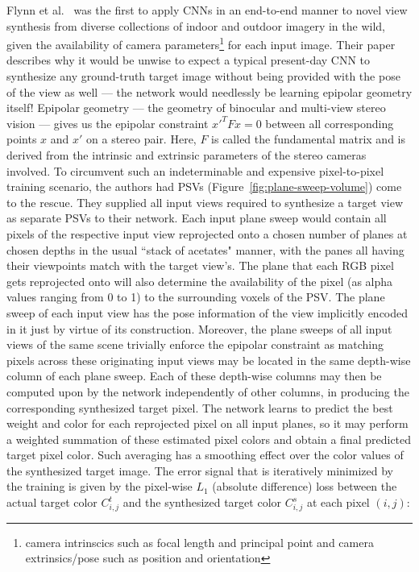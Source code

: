 Flynn et al.~\cite{deep_stereo_2016} was the first to apply CNNs in an end-to-end manner to novel view synthesis from diverse collections of indoor and outdoor imagery in the wild, given the availability of camera parameters\footnote{camera intrinscics such as focal length and principal point and camera extrinsics/pose such as position and orientation} for each input image. Their paper describes why it would be unwise to expect a typical present-day CNN to synthesize any ground-truth target image without being provided with the pose of the view as well --- the network would needlessly be learning epipolar geometry itself! Epipolar geometry --- the geometry of binocular and multi-view stereo vision --- gives us the epipolar constraint $x'^T F x = 0$ between all corresponding points $x$ and $x'$ on a stereo pair. Here, $F$ is called the fundamental matrix and is derived from the intrinsic and extrinsic parameters of the stereo cameras involved. To circumvent such an indeterminable and expensive pixel-to-pixel training scenario, the authors had PSVs (Figure~\ref{fig:plane-sweep-volume}) come to the rescue. They supplied all input views required to synthesize a target view as separate PSVs to their network. Each input plane sweep would contain all pixels of the respective input view reprojected onto a chosen number of planes at chosen depths in the usual ``stack of acetates" manner, with the panes all having their viewpoints match with the target view's. The plane that each RGB pixel gets reprojected onto will also determine the availability of the pixel (as alpha values ranging from 0 to 1) to the surrounding voxels of the PSV. The plane sweep of each input view has the pose information of the view implicitly encoded in it just by virtue of its construction. Moreover, the plane sweeps of all input views of the same scene trivially enforce the epipolar constraint as matching pixels across these originating input views may be located in the same depth-wise column of each plane sweep. Each of these depth-wise columns may then be computed upon by the network independently of other columns, in producing the corresponding synthesized target pixel. The network learns to predict the best weight and color for each reprojected pixel on all input planes, so it may perform a weighted summation of these estimated pixel colors and obtain a final predicted target pixel color. Such averaging has a smoothing effect over the color values of the synthesized target image. The error signal that is iteratively minimized by the training is given by the pixel-wise $L_1$ (absolute difference) loss between the actual target color $C_{i,j}^t$ and the synthesized target color $C_{i,j}^s$ at each pixel $(i,j)$:

